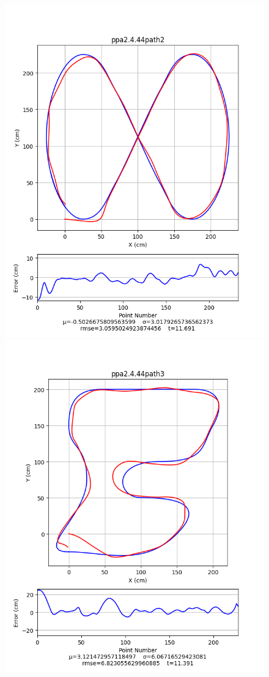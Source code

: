 \documentclass[mla8alt]{mla}
\begin{document}
\begin{paper}
\begin{figure}[H]
\includegraphics[width=\linewidth]{pathData/ppa2path2}
\endminipage\\
\includegraphics[width=\linewidth]{pathData/ppa2path3}

\end{figure}
\end{paper}
\end{document}
